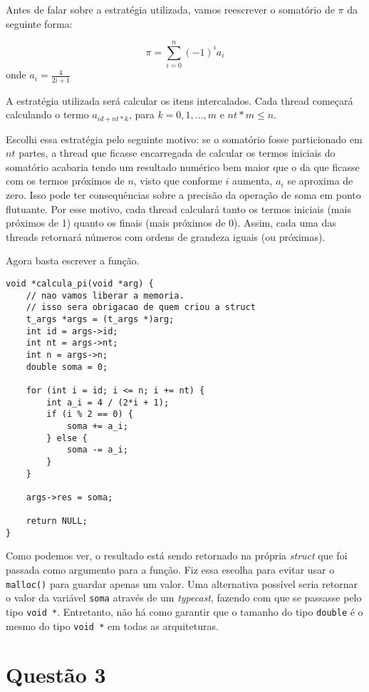 \documentclass{article}
\begin{document}
Antes de falar sobre a estratégia utilizada, vamos reescrever o somatório de $\pi$ da seguinte forma:
\begin{center}
	$$
	\pi = \sum_{i=0}^n{(-1)^ia_i} 
	$$
	onde $a_i = \frac{4}{2i+1}$
\end{center}

A estratégia utilizada será calcular os itens intercalados. Cada thread começará calculando o termo
$a_{id+nt*k}$, para $k=0,1,...,m$ e $nt*m \le n$.

Escolhi essa estratégia pelo seguinte motivo: se o somatório fosse particionado em $nt$ partes,
a thread que ficasse encarregada de calcular os termos iniciais do somatório acabaria tendo um
resultado numérico bem maior que o da que ficasse com os termos próximos de $n$, visto que conforme
$i$ aumenta, $a_i$ se aproxima de zero. Isso pode ter consequências sobre a precisão da
operação de soma em ponto flutuante. Por esse motivo, cada thread calculará tanto os termos iniciais
(mais próximos de 1) quanto os finais (mais próximos de 0). Assim, cada uma das threads retornará números
com ordens de grandeza iguais (ou próximas).

Agora basta escrever a função.

\begin{verbatim}
void *calcula_pi(void *arg) {
	// nao vamos liberar a memoria.
	// isso sera obrigacao de quem criou a struct
	t_args *args = (t_args *)arg;
	int id = args->id;
	int nt = args->nt;
	int n = args->n;
	double soma = 0;

	for (int i = id; i <= n; i += nt) {
		int a_i = 4 / (2*i + 1);
		if (i % 2 == 0) {
			soma += a_i;
		} else {
			soma -= a_i;
		}
	}

	args->res = soma;

	return NULL;
}
\end{verbatim}

Como podemos ver, o resultado está sendo retornado na própria \emph{struct} que foi passada como
argumento para a função. Fiz essa escolha para evitar usar o \texttt{malloc()} para guardar apenas
um valor. Uma alternativa possível seria retornar o valor da variável \texttt{soma} através de um
\emph{typecast}, fazendo com que se passasse pelo tipo \texttt{void *}. Entretanto, não há como garantir
que o tamanho do tipo \texttt{double} é o mesmo do tipo \texttt{void *} em todas as arquiteturas.

\section*{Questão 3}
\end{document}
